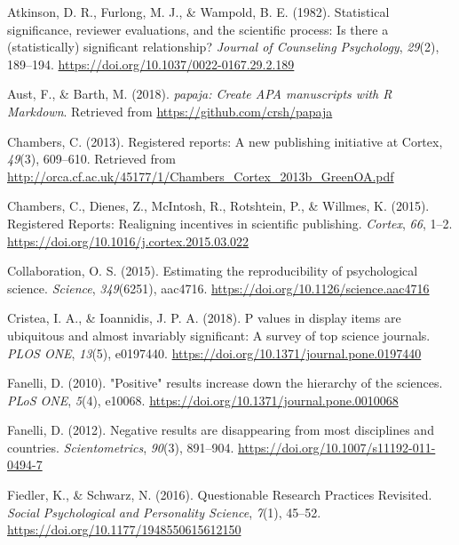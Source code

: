 \documentclass[british,,man,floatsintext]{apa6}
\begin{document}
\leavevmode\hypertarget{ref-Atkinson1982}{}%
Atkinson, D. R., Furlong, M. J., \& Wampold, B. E. (1982). Statistical significance, reviewer evaluations, and the scientific process: Is there a (statistically) significant relationship? \emph{Journal of Counseling Psychology}, \emph{29}(2), 189--194. \url{https://doi.org/10.1037/0022-0167.29.2.189}

\leavevmode\hypertarget{ref-R-papaja}{}%
Aust, F., \& Barth, M. (2018). \emph{papaja: Create APA manuscripts with R Markdown}. Retrieved from \url{https://github.com/crsh/papaja}

\leavevmode\hypertarget{ref-Chambers2013}{}%
Chambers, C. (2013). Registered reports: A new publishing initiative at Cortex, \emph{49}(3), 609--610. Retrieved from \url{http://orca.cf.ac.uk/45177/1/Chambers_Cortex_2013b_GreenOA.pdf}

\leavevmode\hypertarget{ref-Chambers2015}{}%
Chambers, C., Dienes, Z., McIntosh, R., Rotshtein, P., \& Willmes, K. (2015). Registered Reports: Realigning incentives in scientific publishing. \emph{Cortex}, \emph{66}, 1--2. \url{https://doi.org/10.1016/j.cortex.2015.03.022}

\leavevmode\hypertarget{ref-OSC2015}{}%
Collaboration, O. S. (2015). Estimating the reproducibility of psychological science. \emph{Science}, \emph{349}(6251), aac4716. \url{https://doi.org/10.1126/science.aac4716}

\leavevmode\hypertarget{ref-Cristea2018}{}%
Cristea, I. A., \& Ioannidis, J. P. A. (2018). P values in display items are ubiquitous and almost invariably significant: A survey of top science journals. \emph{PLOS ONE}, \emph{13}(5), e0197440. \url{https://doi.org/10.1371/journal.pone.0197440}

\leavevmode\hypertarget{ref-Fanelli2010}{}%
Fanelli, D. (2010). "Positive" results increase down the hierarchy of the sciences. \emph{PLoS ONE}, \emph{5}(4), e10068. \url{https://doi.org/10.1371/journal.pone.0010068}

\leavevmode\hypertarget{ref-Fanelli2012}{}%
Fanelli, D. (2012). Negative results are disappearing from most disciplines and countries. \emph{Scientometrics}, \emph{90}(3), 891--904. \url{https://doi.org/10.1007/s11192-011-0494-7}

\leavevmode\hypertarget{ref-Fiedler2016}{}%
Fiedler, K., \& Schwarz, N. (2016). Questionable Research Practices Revisited. \emph{Social Psychological and Personality Science}, \emph{7}(1), 45--52. \url{https://doi.org/10.1177/1948550615612150}
\end{document}
